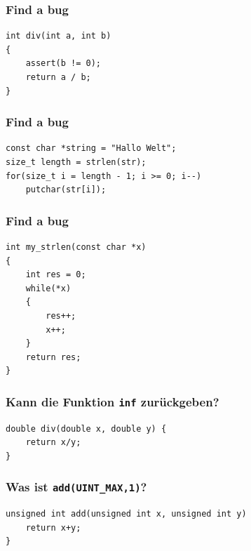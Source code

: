 \documentclass[12pt,compress]{beamer}
\begin{document}


\begin{frame}[fragile]
\frametitle{Find a bug}
\begin{lstlisting}
int div(int a, int b)
{
    assert(b != 0);
    return a / b;
}
\end{lstlisting}
\end{frame}

\begin{frame}[fragile]
\frametitle{Find a bug}
\begin{lstlisting}
const char *string = "Hallo Welt";
size_t length = strlen(str);
for(size_t i = length - 1; i >= 0; i--)
    putchar(str[i]);
\end{lstlisting}
\end{frame}

\begin{frame}[fragile]
\frametitle{Find a bug}
\begin{lstlisting}
int my_strlen(const char *x)
{
    int res = 0;
    while(*x)
    {
        res++;
        x++;
    }
    return res;
}
\end{lstlisting}
\end{frame}

\begin{frame}[fragile]
\frametitle{Kann die Funktion \texttt{inf} zurückgeben?}
\begin{lstlisting}
double div(double x, double y) {
    return x/y;
}
\end{lstlisting}
\end{frame}

\begin{frame}[fragile]
\frametitle{Was ist \texttt{add(UINT\_MAX,1)}?}
\begin{lstlisting}
unsigned int add(unsigned int x, unsigned int y)
    return x+y;
}
\end{lstlisting}
\end{frame}
\end{document}
